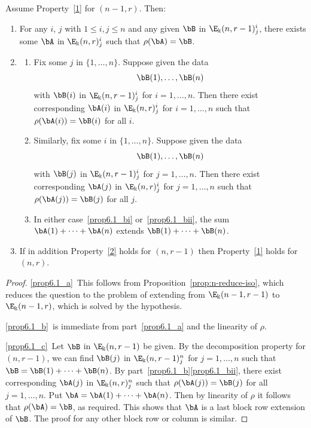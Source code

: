 \begin{prop}\label{prop:extend}
Assume Property~\ref{1} for $(n-1,r)$. Then:
\begin{enumerate}[label=(\alph*)]
\item\label{prop6.1_a} For any $i$, $j$ with $1 \le i,j \le n$ and any given $\bB$ in
 $\E_\Bbbk(n,r-1)^i_j$, there exists some $\bA$ in
 $\E_\Bbbk(n,r)^i_j$ such that $\rho(\bA) = \bB$.

\item\label{prop6.1_b} 
 \begin{enumerate}[label=(\roman*)]
 \item\label{prop6.1_bi} Fix some $j$ in $\{1, \dots, n\}$. Suppose given
 the data
 \[\bB(1), \dots, \bB(n)\] with $\bB(i)$ in
 $\E_\Bbbk(n,r-1)^i_j$ for $i = 1, \dots, n$. Then there exist
 corresponding $\bA(i)$ in $\E_\Bbbk(n,r)^i_j$ for $i = 1, \dots, n$
 such that $\rho(\bA(i)) = \bB(i)$ for all $i$. 

 \item\label{prop6.1_bii} Similarly, fix some $i$ in $\{1, \dots, n\}$. Suppose
 given the data
 \[\bB(1), \dots, \bB(n)\] with 
 $\bB(j)$ in
 $\E_\Bbbk(n,r-1)^i_j$ for $j = 1, \dots, n$. Then there exist
 corresponding $\bA(j)$ in $\E_\Bbbk(n,r)^i_j$ for $j = 1, \dots, n$
 such that $\rho(\bA(j)) = \bB(j)$ for all $j$. 

 \item\label{prop6.1_biii} In either case~\ref{prop6.1_bi} or~\ref{prop6.1_bii}, the sum $\bA(1)
 + \cdots + \bA(n)$ extends $\bB(1) + \cdots + \bB(n)$.
 \end{enumerate}
 
\item\label{prop6.1_c} If in addition Property~\ref{2} holds for $(n,r-1)$ then
 Property~\ref{1} holds for $(n,r)$.
\end{enumerate}
\end{prop}

\begin{proof}
\ref{prop6.1_a}~This follows from Proposition~\ref{prop:n-reduce-iso}, which
 reduces the question to the problem of extending from
 $\E_\Bbbk(n-1,r-1)$ to $\E_\Bbbk(n-1,r)$, which is solved by the
 hypothesis.

\ref{prop6.1_b}~is immediate from part~\ref{prop6.1_a} and the linearity of $\rho$.

\ref{prop6.1_c}~Let $\bB$ in $\E_\Bbbk(n,r-1)$ be given. By the decomposition
 property for $(n,r-1)$, we can find $\bB(j)$ in
 $\E_\Bbbk(n,r-1)^n_j$ for $j = 1, \dots, n$ such that $\bB = \bB(1)
 + \cdots + \bB(n)$. By part~\ref{prop6.1_b}\ref{prop6.1_bii}, there exist corresponding
 $\bA(j)$ in $\E_\Bbbk(n,r)^n_j$ such that $\rho(\bA(j)) = \bB(j)$
 for all $j = 1, \dots, n$. Put $\bA = \bA(1) + \cdots +
 \bA(n)$. Then by linearity of $\rho$ it follows that $\rho(\bA) =
 \bB$, as required. This shows that $\bA$ is a last block row
 extension of $\bB$. The proof for any other block row or column is
 similar.
\end{proof}

